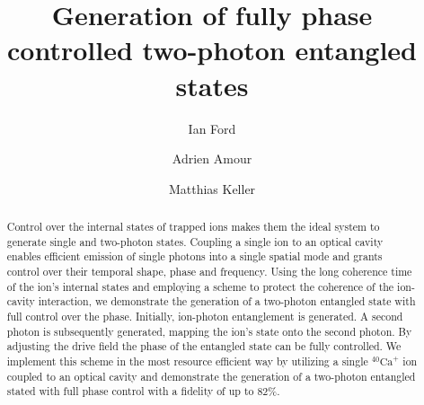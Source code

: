 \documentclass[aps,prl,twocolumn,floatfix,superscriptaddress]{revtex4-2}
\begin{document}
\title{Generation of fully phase controlled two-photon entangled states}

\author{Ian Ford}

\author{Adrien Amour}

\author{Matthias Keller}


\begin{abstract}

Control over the internal states of trapped ions makes them the ideal system to generate single and two-photon states. Coupling a single ion to an optical cavity enables efficient emission of single photons into a single spatial mode and  grants control over their temporal shape, phase and frequency.
Using the long coherence time of the ion's internal states and employing a scheme to protect the coherence of the ion-cavity interaction, we demonstrate the generation of a two-photon entangled state with full control over the phase. Initially, ion-photon entanglement is generated. A second photon is subsequently generated, mapping the ion's state onto the second photon. By adjusting the drive field the phase of the entangled state can be fully controlled.
We implement this scheme in the most resource efficient way by utilizing a single $^{40}\text{Ca}^{+}$ ion coupled to an optical cavity and demonstrate the generation of a two-photon entangled stated with full phase control with a fidelity of up to 82\%.
\end{abstract}

\maketitle
\end{document}
